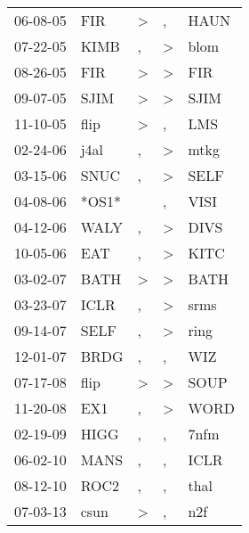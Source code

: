 \begin{supertabular}{lllll}
 06-08-05 &    FIR &  \textgreater &                , &   HAUN \\
 07-22-05 &   KIMB &             , &     \textgreater &   blom \\
 08-26-05 &    FIR &  \textgreater &     \textgreater &    FIR \\
 09-07-05 &   SJIM &  \textgreater &     \textgreater &   SJIM \\
 11-10-05 &   flip &  \textgreater &                , &    LMS \\
 02-24-06 &   j4al &             , &     \textgreater &   mtkg \\
 03-15-06 &   SNUC &             , &     \textgreater &   SELF \\
 04-08-06 &  *OS1* &               &                , &   VISI \\
 04-12-06 &   WALY &             , &     \textgreater &   DIVS \\
 10-05-06 &    EAT &             , &     \textgreater &   KITC \\
 03-02-07 &   BATH &  \textgreater &     \textgreater &   BATH \\
 03-23-07 &   ICLR &             , &     \textgreater &   srms \\
 09-14-07 &   SELF &             , &     \textgreater &   ring \\
 12-01-07 &   BRDG &             , &                , &    WIZ \\
 07-17-08 &   flip &  \textgreater &     \textgreater &   SOUP \\
 11-20-08 &    EX1 &             , &     \textgreater &   WORD \\
 02-19-09 &   HIGG &             , &                , &   7nfm \\
 06-02-10 &   MANS &             , &                , &   ICLR \\
 08-12-10 &   ROC2 &             , &                , &   thal \\
 07-03-13 &   csun &  \textgreater &                , &    n2f \\
\end{supertabular}
